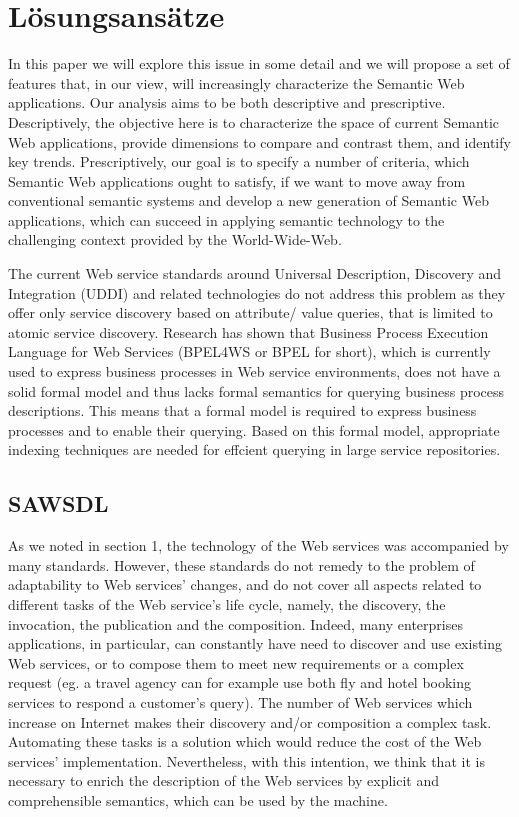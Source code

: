 \section{Lösungsansätze}
\label{l:loesungen}

In this paper we will explore this issue in some detail and we will propose a set of
features that, in our view, will increasingly characterize the Semantic Web
applications. Our analysis aims to be both descriptive and prescriptive. Descriptively,
the objective here is to characterize the space of current Semantic Web applications,
provide dimensions to compare and contrast them, and identify key trends.
Prescriptively, our goal is to specify a number of criteria, which Semantic Web
applications ought to satisfy, if we want to move away from conventional semantic
systems and develop a new generation of Semantic Web applications, which can
succeed in applying semantic technology to the challenging context provided by the
World-Wide-Web. \cite{ngswa}

The current Web service standards around Universal
Description, Discovery and Integration (UDDI) and related technologies do not address this
problem as they offer only service discovery based on attribute/ value queries, that is limited
to atomic service discovery. Research has shown that Business Process Execution Language
for Web Services (BPEL4WS or BPEL for short), which is currently used to express business
processes in Web service environments, does not have a solid formal model and thus lacks
formal semantics for querying business process descriptions. This means that a formal model is
required to express business processes and to enable their querying. Based on this formal model,
appropriate indexing techniques are needed for effcient querying in large service repositories. \cite{mothesis}

\subsection{SAWSDL}

As we noted in section 1, the technology of the Web
services was accompanied by many standards. However,
these standards do not remedy to the problem of adaptability
to Web services’ changes, and do not cover all aspects related
to different tasks of the Web service’s life cycle, namely, the
discovery, the invocation, the publication and the
composition. Indeed, many enterprises applications, in
particular, can constantly have need to discover and use
existing Web services, or to compose them to meet new
requirements or a complex request (eg. a travel agency can
for example use both fly and hotel booking services to
respond a customer’s query). The number of Web services
which increase on Internet makes their discovery and/or
composition a complex task. Automating these tasks is a
solution which would reduce the cost of the Web services’
implementation. Nevertheless, with this intention, we think
that it is necessary to enrich the description of the Web
services by explicit and comprehensible semantics, which can
be used by the machine. \cite{ei-sawsdl}

